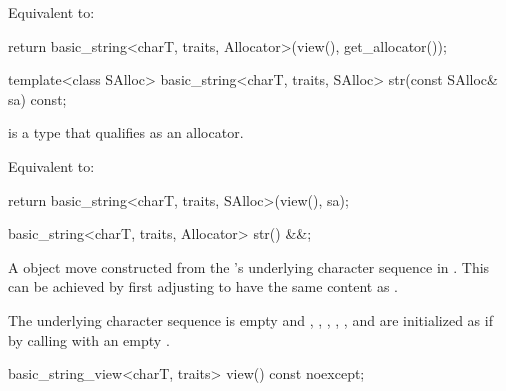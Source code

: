 \begin{itemdescr}
\pnum
\effects
Equivalent to:
\begin{codeblock}
return basic_string<charT, traits, Allocator>(view(), get_allocator());
\end{codeblock}
\end{itemdescr}

%
\begin{itemdecl}
template<class SAlloc>
  basic_string<charT, traits, SAlloc> str(const SAlloc& sa) const;
\end{itemdecl}

\begin{itemdescr}
\pnum
\constraints
{} is a type that
qualifies as an allocator.

\pnum
\effects
Equivalent to:
\begin{codeblock}
return basic_string<charT, traits, SAlloc>(view(), sa);
\end{codeblock}
\end{itemdescr}

\begin{itemdecl}
basic_string<charT, traits, Allocator> str() &&;
\end{itemdecl}

\begin{itemdescr}
\pnum
\returns
A  object
move constructed from
the 's underlying character sequence in .
This can be achieved by first adjusting  to have
the same content as .

\pnum
\ensures
The underlying character sequence  is empty and
, , , ,
, and 
are initialized as if by calling 
with an empty .
\end{itemdescr}

%
\begin{itemdecl}
basic_string_view<charT, traits> view() const noexcept;
\end{itemdecl}

